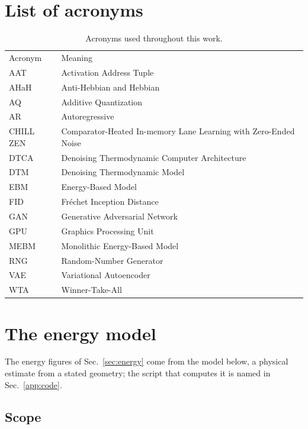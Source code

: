 \documentclass[reprint,amsmath,amssymb,aps,nofootinbib]{revtex4-2}
\begin{document}
\appendix

\section{List of acronyms}\label{app:acronyms}

\begin{table}[h]
\caption{Acronyms used throughout this work.\label{tab:acronyms}}
\begin{ruledtabular}
\begin{tabular}{lp{5.8cm}}
Acronym & Meaning \\
\colrule
AAT & Activation Address Tuple \\
AHaH & Anti-Hebbian and Hebbian \\
AQ & Additive Quantization \\
AR & Autoregressive \\
CHILL ZEN & Comparator-Heated In-memory Lane
  Learning with Zero-Ended Noise \\
DTCA & Denoising Thermodynamic Computer Architecture \\
DTM & Denoising Thermodynamic Model \\
EBM & Energy-Based Model \\
FID & Fr\'echet Inception Distance \\
GAN & Generative Adversarial Network \\
GPU & Graphics Processing Unit \\
MEBM & Monolithic Energy-Based Model \\
RNG & Random-Number Generator \\
VAE & Variational Autoencoder \\
WTA & Winner-Take-All \\
\end{tabular}
\end{ruledtabular}
\end{table}



\section{The energy model}\label{app:energy}

The energy figures of Sec.~\ref{sec:energy} come from the model below,
a physical estimate from a stated geometry; the script that computes it
is named in Sec.~\ref{app:code}.

\subsection{Scope}\label{app:scope}
\end{document}
